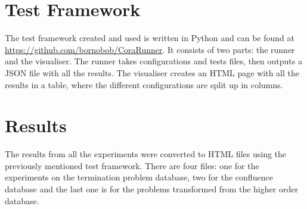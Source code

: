 \chapter{Test Framework}\label{testframework}
The test framework created and used is written in Python and can be found at \url{https://github.com/bornobob/CoraRunner}. It consists of two parts: the runner and the visualiser. The runner takes configurations and tests files, then outputs a JSON file with all the results. The visualiser creates an HTML page with all the results in a table, where the different configurations are split up in columns. 

\chapter{Results}\label{results}
The results from all the experiments were converted to HTML files using the previously mentioned test framework. There are four files: one for the experiments on the termination problem database, two for the confluence database and the last one is for the problems transformed from the higher order database. 